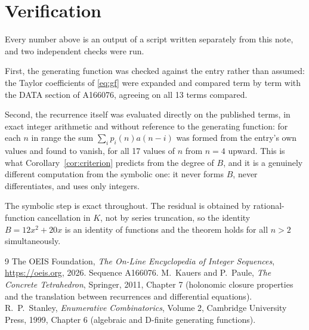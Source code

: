 \documentclass[11pt,a4paper]{article}
\theoremstyle{plain}
\theoremstyle{definition}
\begin{document}
\section{Verification}

Every number above is an output of a script written separately from this note, and two
independent checks were run.

First, the generating function was checked against the entry rather than assumed: the
Taylor coefficients of \eqref{eq:gf} were expanded and compared term by term with the DATA
section of A166076, agreeing on all 13 terms compared.

Second, the recurrence itself was evaluated directly on the published terms, in exact
integer arithmetic and without reference to the generating function: for each $n$ in range
the sum $\sum_{i}p_{i}(n)a(n-i)$ was formed from the entry's own values and found to
vanish, for all 17 values of $n$ from $n=4$ upward. This is what
Corollary~\ref{cor:criterion} predicts from the degree of $B$, and it is a genuinely
different computation from the symbolic one: it never forms $B$, never differentiates, and
uses only integers.

The symbolic step is exact throughout. The residual is obtained by rational-function
cancellation in $K$, not by series truncation, so the identity $B=12 x^{2} + 20 x$ is an
identity of functions and the theorem holds for all $n>2$ simultaneously.

\begin{thebibliography}{9}
 The OEIS Foundation, \emph{The On-Line Encyclopedia of Integer Sequences},
\url{https://oeis.org}, 2026. Sequence A166076.
 M.~Kauers and P.~Paule, \emph{The Concrete Tetrahedron}, Springer, 2011,
Chapter 7 (holonomic closure properties and the translation between recurrences and
differential equations).
 R.~P.~Stanley, \emph{Enumerative Combinatorics}, Volume 2, Cambridge
University Press, 1999, Chapter 6 (algebraic and D-finite generating functions).
\end{thebibliography}
\end{document}
